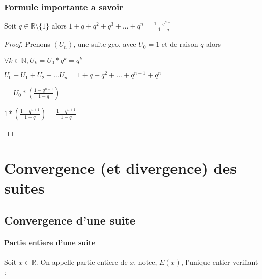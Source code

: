 \documentclass[a4paper,10pt]{book}
\begin{document}
			\subsection{Formule importante a savoir}
			\begin{prop}
				Soit $q \in \mathbb{R} \setminus \big\{1\big\} $ alors $1+q+q^2+q^3+...+q^n = \frac{1-q^{n+1}}{1-q}$
			\end{prop}

			\begin{proof}
				Prenons $(U_n)$, une suite geo. avec $U_0 = 1$ et de raison $q$ alors
				\begin{description}
					\item $\forall k \in \mathbb{N}, U_k = U_0 * q^k = q^k$
					\item $U_0 + U_1 + U_2 + ... U_n = 1 + q + q^2 + ... + q^{n-1} + q^n$
					\item $ = U_0 * (\frac{1-q^{n+1}}{1-q})$
					\item $1*(\frac{1-q^{n+1}}{1-q}) = \frac{1-q^{n+1}}{1-q}$
				\end{description}
			\end{proof}



		\chapter{Convergence (et divergence) des suites}
			\section{Convergence d'une suite}
			\label{sec:Convergence d'une suite}
				\subsubsection{Partie entiere d'une suite}
				\label{subs:Partie entiere d'une suite}

			\begin{prop}
				Soit $x \in \mathbb{R}$. On appelle partie entiere de $x$, notee, $E(x)$, l'unique entier verifiant :\\

					\medskip\\
			\end{prop}
\end{document}
